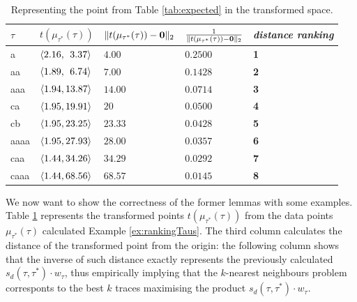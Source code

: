 \begin{table}[!t]
\centering
\caption{Representing the point from Table \ref{tab:expected} in the transformed space.}\label{tab:transf}
\begin{tabular}{ll|lll}
	\toprule
	
	$\tau$ & $t(\mu_{\tau^*}(\tau))$ & $\norm{t(\mu_{\tau^*}(\tau))-\vec{0}}{2}$ & $\frac{1}{\norm{t(\mu_{\tau^*}(\tau))-\vec{0}}{2}}$ & \textit{distance ranking}\\
	
	\midrule	
	a   & $\braket{2.16, \;\,3.37}$ & $4.00$ & $0.2500$ & \textbf{1}\\
	{aa}  & $\braket{1.89, \;\,6.74}$ & $7.00$ & $0.1428$ & \textbf{2}\\
	aaa   & $\braket{1.94, 13.87}$ & $14.00$ & $0.0714$ & \textbf{3}\\
	ca   & $\braket{1.95, 19.91}$ & $20$ & $0.0500$ & \textbf{4}\\
	{cb}  & $\braket{1.95, 23.25}$ & $23.33$ & $0.0428$ & \textbf{5}\\
aaaa   & $\braket{1.95, 27.93}$ & $28.00$ & $0.0357$ & \textbf{6}\\
caa   & $\braket{1.44, 34.26}$ & $34.29$ & $0.0292$ & \textbf{7}\\
caaa   & $\braket{1.44, 68.56}$ & $68.57$ & $0.0145$ & \textbf{8}\\
	\bottomrule
\end{tabular}
\end{table}
\begin{example}
We now want to show the correctness of the former lemmas with some examples. 
Table \ref{tab:transf} represents the transformed points $t(\mu_{\tau^*}(\tau))$ from the data points $\mu_{\tau^*}(\tau)$  calculated  Example \ref{ex:rankingTaus}. The third column calculates the distance of the transformed point from the origin: the following column shows that the inverse of such distance exactly represents the previously calculated $s_d(\tau,\tau^*)\cdot w_\tau$, thus empirically implying that the $k$-nearest neighbours problem corresponts to the best $k$ traces maximising the product $s_d(\tau,\tau^*)\cdot w_\tau$.
\end{example}


